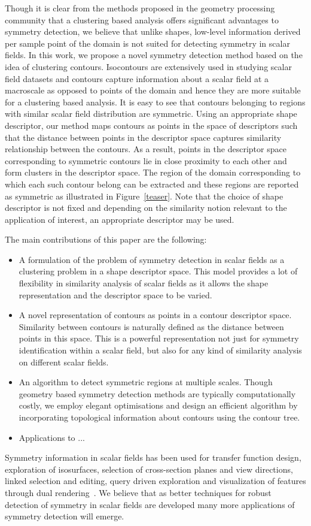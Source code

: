 \documentclass[review,journal]{vgtc}         %
\begin{document}
Though it is clear from the methods proposed in the geometry processing community
that a clustering based analysis offers significant advantages to symmetry detection,
we believe that unlike shapes, low-level information derived per sample point of the 
domain is not suited for detecting symmetry in scalar fields. In this work, we propose 
a novel symmetry detection method based on the idea of clustering contours. Isocontours 
are extensively used in studying scalar field datasets and contours capture information 
about a scalar field at a macroscale as opposed to points of the domain and hence they
are more suitable for a clustering based analysis. It is easy to see that contours
belonging to regions with similar scalar field distribution are symmetric. Using an appropriate
shape descriptor, our method maps contours as points in the space of descriptors 
such that the distance between points in the descriptor space captures similarity 
relationship between the contours. As a result, points in the descriptor space 
corresponding to symmetric contours lie in close 
proximity to each other and form clusters in the descriptor space. The region of the domain
corresponding to which each such contour belong can be extracted and these regions
are reported as symmetric as illustrated in Figure~\ref{teaser}. Note that the choice
of shape descriptor is not fixed and depending on the similarity notion relevant
to the application of interest, an appropriate descriptor may be used.

The main contributions of this paper are the following:
\begin{itemize}
\item A formulation of the problem of symmetry detection in scalar fields
as a clustering problem in a shape descriptor space. This model
provides a lot of flexibility in similarity analysis of scalar fields
as it allows the shape representation and the descriptor space to be varied.
\item A novel representation of contours as points in a contour descriptor space.
Similarity between contours is naturally defined as the distance between points 
in this space. This is a powerful representation not just for symmetry identification
within a scalar field, but also for any kind of similarity analysis on different
scalar fields.
\item An algorithm to detect symmetric regions at multiple scales. Though geometry based 
symmetry detection methods are typically computationally costly, we employ elegant
optimisations and design an efficient algorithm by incorporating topological information 
about contours using the contour tree.
\item Applications to ...
\end{itemize}
Symmetry information in scalar fields
has been used for transfer function design, exploration of isosurfaces, selection of cross-section
planes and view directions, linked selection and editing, query driven exploration
and visualization of features through dual rendering~\cite{ThomN11,HongS08,ThomN13,MasoodTN13}.
We believe that as better techniques for robust detection of symmetry in scalar fields are developed
many more applications of symmetry detection will emerge.
\end{document}
